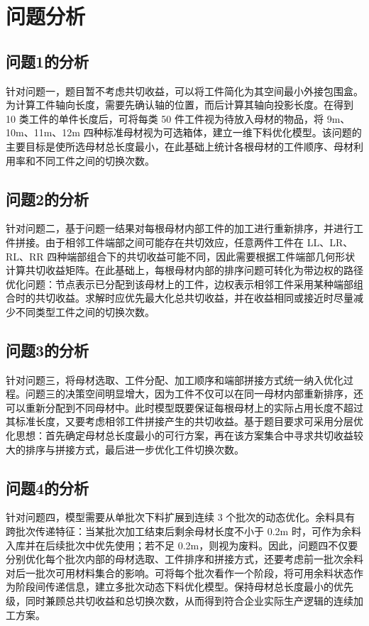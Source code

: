\documentclass[UTF8]{ctexart}
\begin{document}
\section{问题分析}
\subsection{问题1的分析}
针对问题一，题目暂不考虑共切收益，可以将工件简化为其空间最小外接包围盒。为计算工件轴向长度，需要先确认轴的位置，而后计算其轴向投影长度。在得到 10 类工件的单件长度后，可将每类 50 件工件视为待放入母材的物品，将 9m、10m、11m、12m 四种标准母材视为可选箱体，建立一维下料优化模型。该问题的主要目标是使所选母材总长度最小，在此基础上统计各根母材的工件顺序、母材利用率和不同工件之间的切换次数。
\subsection{问题2的分析}
针对问题二，基于问题一结果对每根母材内部工件的加工进行重新排序，并进行工件拼接。由于相邻工件端部之间可能存在共切效应，任意两件工件在 LL、LR、RL、RR 四种端部组合下的共切收益可能不同，因此需要根据工件端部几何形状计算共切收益矩阵。在此基础上，每根母材内部的排序问题可转化为带边权的路径优化问题：节点表示已分配到该母材上的工件，边权表示相邻工件采用某种端部组合时的共切收益。求解时应优先最大化总共切收益，并在收益相同或接近时尽量减少不同类型工件之间的切换次数。
\subsection{问题3的分析}
针对问题三，将母材选取、工件分配、加工顺序和端部拼接方式统一纳入优化过程。问题三的决策空间明显增大，因为工件不仅可以在同一母材内部重新排序，还可以重新分配到不同母材中。此时模型既要保证每根母材上的实际占用长度不超过其标准长度，又要考虑相邻工件拼接产生的共切收益。基于题目要求可采用分层优化思想：首先确定母材总长度最小的可行方案，再在该方案集合中寻求共切收益较大的排序与拼接方式，最后进一步优化工件切换次数。
\subsection{问题4的分析}
针对问题四，模型需要从单批次下料扩展到连续 3 个批次的动态优化。余料具有跨批次传递特征：当某批次加工结束后剩余母材长度不小于 0.2m 时，可作为余料入库并在后续批次中优先使用；若不足 0.2m，则视为废料。因此，问题四不仅要分别优化每个批次内部的母材选取、工件排序和拼接方式，还要考虑前一批次余料对后一批次可用材料集合的影响。可将每个批次看作一个阶段，将可用余料状态作为阶段间传递信息，建立多批次动态下料优化模型。保持母材总长度最小的优先级，同时兼顾总共切收益和总切换次数，从而得到符合企业实际生产逻辑的连续加工方案。
\end{document}
